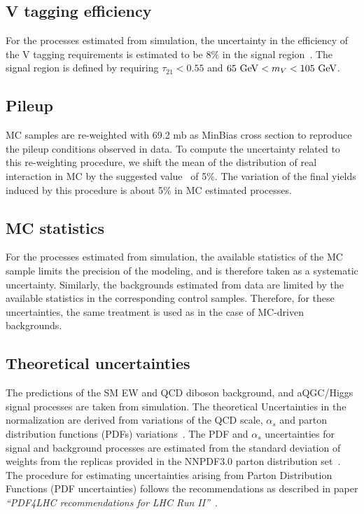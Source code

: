 \subsection{V tagging efficiency}

For the processes estimated from simulation, the uncertainty in the efficiency of the V tagging requirements is estimated to be $8\%$ in the signal region~\cite{jettagging}. The signal region is defined by requiring $\tau_{21}<0.55$ and $ 65 ~\mathrm{GeV} < m_{V} < 105 ~\mathrm{GeV}$. 

\subsection{Pileup}

MC samples are re-weighted with 69.2 mb as MinBias cross section to reproduce the pileup conditions observed in data.
To compute the uncertainty related to this re-weighting procedure, we
shift the mean of the distribution of real interaction in MC by the
suggested value~\cite{twiki:Pileup} of 5\%. 
The variation of the final yields induced by
this procedure is about 5\% in MC estimated processes. 


\subsection{MC statistics}

For the processes estimated from simulation, the
available statistics of the MC sample limits the precision of the
modeling, and is therefore taken as a systematic
uncertainty. Similarly, the backgrounds estimated from data are
limited by the available statistics in the corresponding control
samples. Therefore, for these uncertainties, the same treatment is
used as in the case of MC-driven backgrounds.

\subsection{Theoretical uncertainties}
The predictions of the SM EW and QCD diboson background, and aQGC/Higgs signal processes are taken from simulation. The theoretical Uncertainties in the normalization are derived from variations of the QCD scale, $\alpha_{s}$
and parton distribution functions (PDFs) variations~\cite{Botje:2011sn,Alekhin:2011sk,Lai:2010vv,Martin2009,Ball:2011mu}.
The PDF and $\alpha_s$ uncertainties for signal and background processes are estimated from the standard deviation of weights from the replicas provided in the NNPDF3.0 parton distribution set~\cite{nnpdf}. The procedure for estimating uncertainties arising from Parton Distribution Functions (PDF uncertainties) follows the recommendations as described in paper \textit{``PDF4LHC recommendations for LHC Run II''}~\cite{Butterworth2015}.

